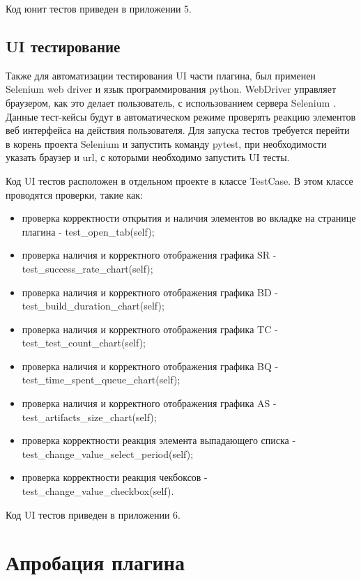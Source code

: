 Код юнит тестов приведен в приложении 5.

\subsection{UI тестирование}

Также для автоматизации тестирования UI части плагина, был применен Selenium web driver и язык программирования python. WebDriver управляет браузером, как это делает пользователь, с использованием сервера Selenium \cite{webdriver}. Данные тест-кейсы будут в автоматическом режиме проверять реакцию элементов веб интерфейса на действия пользователя. Для запуска тестов требуется перейти в корень проекта Selenium и запустить команду pytest, при необходимости указать браузер и url, с которыми необходимо запустить UI тесты.

Код UI тестов расположен в отдельном проекте в классе TestCase. В этом классе проводятся проверки, такие как:

\begin{itemize}
	\item проверка корректности открытия и наличия элементов во вкладке на странице плагина - test\_open\_tab(self);
	\item проверка наличия и корректного отображения графика SR - test\_success\_rate\_chart(self);
	\item проверка наличия и корректного отображения графика BD - test\_build\_duration\_chart(self);
	\item проверка наличия и корректного отображения графика TC - test\_test\_count\_chart(self);
	\item проверка наличия и корректного отображения графика BQ - test\_time\_spent\_queue\_chart(self);
	\item проверка наличия и корректного отображения графика AS - test\_artifacts\_size\_chart(self);
	\item проверка корректности реакция элемента выпадающего списка - test\_change\_value\_select\_period(self);
	\item проверка  корректности реакция чекбоксов - test\_change\_value\_checkbox(self).
\end{itemize}

Код UI тестов приведен в приложении 6.



 \section{Апробация плагина} \label{ch4:sec2}
 
